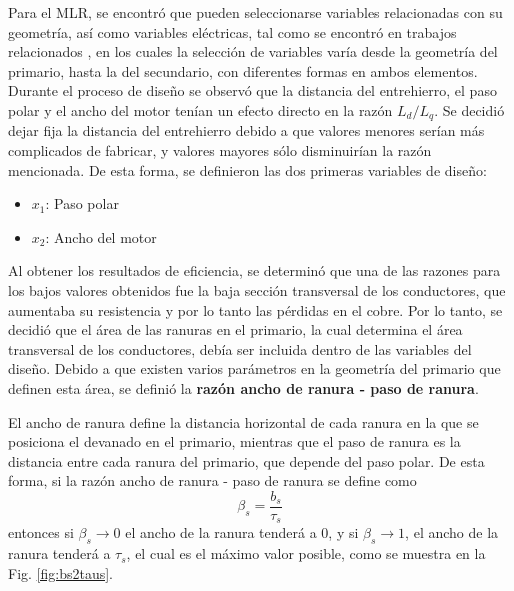 Para el MLR, se encontró que pueden seleccionarse variables relacionadas con su geometría, así como variables eléctricas, tal como se encontró en trabajos relacionados \cite{mendrela2008,chayopitak2005,mohammadi2015,orlova2015}, en los cuales la selección de variables varía desde la geometría del primario, hasta la del secundario, con diferentes formas en ambos elementos. Durante el proceso de diseño se observó que la distancia del entrehierro, el paso polar y el ancho del motor tenían un efecto directo en la razón $L_d/L_q$. Se decidió dejar fija la distancia del entrehierro debido a que valores menores serían más complicados de fabricar, y valores mayores sólo disminuirían la razón mencionada. De esta forma, se definieron las dos primeras variables de diseño:
\begin{itemize}
\item $x_1$: Paso polar
\item $x_2$: Ancho del motor
\end{itemize}

Al obtener los resultados de eficiencia, se determinó que una de las razones para los bajos valores obtenidos fue la baja sección transversal de los conductores, que aumentaba su resistencia y por lo tanto las pérdidas en el cobre. Por lo tanto, se decidió que el área de las ranuras en el primario, la cual determina el área transversal de los conductores, debía ser incluida dentro de las variables del diseño. Debido a que existen varios parámetros en la geometría del primario que definen esta área, se definió la \textbf{razón ancho de ranura - paso de ranura}.

El ancho de ranura define la distancia horizontal de cada ranura en la que se posiciona el devanado en el primario, mientras que el paso de ranura es la distancia entre cada ranura del primario, que depende del paso polar. De esta forma, si la razón ancho de ranura - paso de ranura se define como
\begin{equation*}
\beta_s = \frac{b_s}{\tau_s}
\end{equation*}
entonces si $\beta_s\rightarrow 0$ el ancho de la ranura tenderá a 0, y si $\beta_s\rightarrow 1$, el ancho de la ranura tenderá a $\tau_s$, el cual es el máximo valor posible, como se muestra en la Fig. \ref{fig:bs2taus}.

